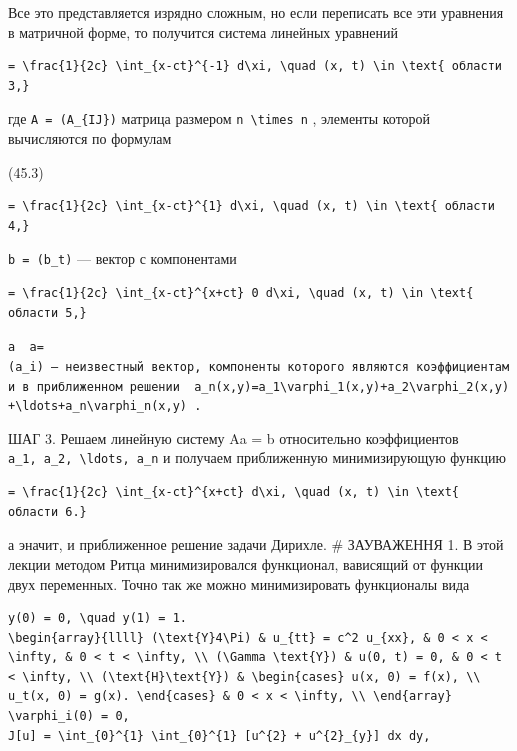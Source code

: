 \documentclass[
  ukrainian,
]{article}
\begin{document}
Все это представляется изрядно сложным, но если переписать все эти
уравнения в матричной форме, то получится система линейных уравнений

\begin{verbatim}
= \frac{1}{2c} \int_{x-ct}^{-1} d\xi, \quad (x, t) \in \text{ области 3,}
\end{verbatim}

где \texttt{A\ =\ (A\_\{IJ\})} матрица размером
\texttt{n\ \textbackslash{}times\ n} , элементы которой вычисляются по
формулам

(45.3)

\begin{verbatim}
= \frac{1}{2c} \int_{x-ct}^{1} d\xi, \quad (x, t) \in \text{ области 4,}
\end{verbatim}

\texttt{b\ =\ (b\_t)} --- вектор с компонентами

\begin{verbatim}
= \frac{1}{2c} \int_{x-ct}^{x+ct} 0 d\xi, \quad (x, t) \in \text{ области 5,}
\end{verbatim}

\texttt{а\ \ \textquotesingle{}a=(a\_i)\textquotesingle{}\ —\ неизвестный\ вектор,\ компоненты\ которого\ являются\ коэффициентами\ в\ приближенном\ решении\ \ \textquotesingle{}a\_n(x,y)=a\_1\textbackslash{}varphi\_1(x,y)+a\_2\textbackslash{}varphi\_2(x,y)+\textbackslash{}ldots+a\_n\textbackslash{}varphi\_n(x,y)\textquotesingle{}\ .}

ШАГ 3. Решаем линейную систему Aa = b относительно коэффициентов
\texttt{a\_1,\ a\_2,\ \textbackslash{}ldots,\ a\_n} и получаем
приближенную минимизирующую функцию

\begin{verbatim}
= \frac{1}{2c} \int_{x-ct}^{x+ct} d\xi, \quad (x, t) \in \text{ области 6.}
\end{verbatim}

а эначит, и приближенное решение задачи Дирихле. \# ЗАУВАЖЕННЯ 1. В этой
лекции методом Ритца минимизировался функционал, вависящий от функции
двух переменных. Точно так же можно минимизировать функционалы вида

\begin{verbatim}
y(0) = 0, \quad y(1) = 1.
\begin{array}{llll} (\text{Y}4\Pi) & u_{tt} = c^2 u_{xx}, & 0 < x < \infty, & 0 < t < \infty, \\ (\Gamma \text{Y}) & u(0, t) = 0, & 0 < t < \infty, \\ (\text{H}\text{Y}) & \begin{cases} u(x, 0) = f(x), \\ u_t(x, 0) = g(x). \end{cases} & 0 < x < \infty, \\ \end{array}
\varphi_i(0) = 0,
J[u] = \int_{0}^{1} \int_{0}^{1} [u^{2} + u^{2}_{y}] dx dy,
\end{verbatim}
\end{document}
